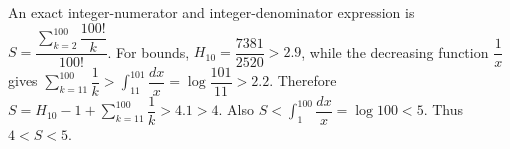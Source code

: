 An exact integer-numerator and integer-denominator expression is $S=\dfrac{\sum_{k=2}^{100}\dfrac{100!}{k}}{100!}$. For bounds, $H_{10}=\dfrac{7381}{2520}>2.9$, while the decreasing function $\dfrac{1}{x}$ gives $\sum_{k=11}^{100}\dfrac{1}{k}>\int_{11}^{101}\dfrac{dx}{x}=\log\dfrac{101}{11}>2.2$. Therefore $S=H_{10}-1+\sum_{k=11}^{100}\dfrac{1}{k}>4.1>4$. Also $S<\int_1^{100}\dfrac{dx}{x}=\log 100<5$. Thus $\boxed{4<S<5}$.
